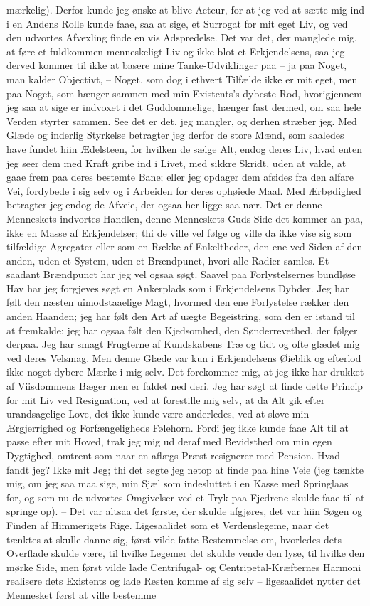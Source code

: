 \documentclass[12pt,a4paper]{article}
\begin{document}
mærkelig). Derfor kunde jeg ønske at blive Acteur, for at jeg ved at sætte mig ind i en Andens Rolle kunde faae, saa at sige, et Surrogat for mit eget Liv, og ved den udvortes Afvexling finde en vis Adspredelse. Det var det, der manglede mig, at føre et fuldkommen menneskeligt Liv og ikke blot et Erkjendelsens, saa jeg derved kommer til ikke at basere mine Tanke-Udviklinger paa – ja paa Noget, man kalder Objectivt, – Noget, som dog i ethvert Tilfælde ikke er mit eget, men paa Noget, som hænger sammen med min Existents's dybeste Rod, hvorigjennem jeg saa at sige er indvoxet i det Guddommelige, hænger fast dermed, om saa hele Verden styrter sammen. See det er det, jeg mangler, og derhen stræber jeg. Med Glæde og inderlig Styrkelse betragter jeg derfor de store Mænd, som saaledes have fundet hiin Ædelsteen, for hvilken de sælge Alt, endog deres Liv, hvad enten jeg seer dem med Kraft gribe ind i Livet, med sikkre Skridt, uden at vakle, at gaae frem paa deres bestemte Bane; eller jeg opdager dem afsides fra den alfare Vei, fordybede i sig selv og i Arbeiden for deres ophøiede Maal. Med Ærbødighed betragter jeg endog de Afveie, der ogsaa her ligge saa nær. Det er denne Menneskets indvortes Handlen, denne Menneskets Guds-Side det kommer an paa, ikke en Masse af Erkjendelser; thi de ville vel følge og ville da ikke vise sig som tilfældige Agregater eller som en Række af Enkeltheder, den ene ved Siden af den anden, uden et System, uden et Brændpunct, hvori alle Radier samles. Et saadant Brændpunct har jeg vel ogsaa søgt. Saavel paa Forlystelsernes bundløse Hav har jeg forgjeves søgt en Ankerplads som i Erkjendelsens Dybder. Jeg har følt den næsten uimodstaaelige Magt, hvormed den ene Forlystelse rækker den anden Haanden; jeg har følt den Art af uægte Begeistring, som den er istand til at fremkalde; jeg har ogsaa følt den Kjedsomhed, den Sønderrevethed, der følger derpaa. Jeg har smagt Frugterne af Kundskabens Træ og tidt og ofte glædet mig ved deres Velsmag. Men denne Glæde var kun i Erkjendelsens Øieblik og efterlod ikke noget dybere Mærke i mig selv. Det forekommer mig, at jeg ikke har drukket af Viisdommens Bæger men er faldet ned deri. Jeg har søgt at finde dette Princip for mit Liv ved Resignation, ved at forestille mig selv, at da Alt gik efter urandsagelige Love, det ikke kunde være anderledes, ved at sløve min Ærgjerrighed og Forfængeligheds Følehorn. Fordi jeg ikke kunde faae Alt til at passe efter mit Hoved, trak jeg mig ud deraf med Bevidsthed om min egen Dygtighed, omtrent som naar en aflægs Præst resignerer med Pension. Hvad fandt jeg? Ikke mit Jeg; thi det søgte jeg netop at finde paa hine Veie (jeg tænkte mig, om jeg saa maa sige, min Sjæl som indesluttet i en Kasse med Springlaas for, og som nu de udvortes Omgivelser ved et Tryk paa Fjedrene skulde faae til at springe op). – Det var altsaa det første, der skulde afgjøres, det var hiin Søgen og Finden af Himmerigets Rige. Ligesaalidet som et Verdenslegeme, naar det tænktes at skulle danne sig, først vilde fatte Bestemmelse om, hvorledes dets Overflade skulde være, til hvilke Legemer det skulde vende den lyse, til hvilke den mørke Side, men først vilde lade Centrifugal- og Centripetal-Kræfternes Harmoni realisere dets Existents og lade Resten komme af sig selv – ligesaalidet nytter det Mennesket først at ville bestemme 
\end{document}
